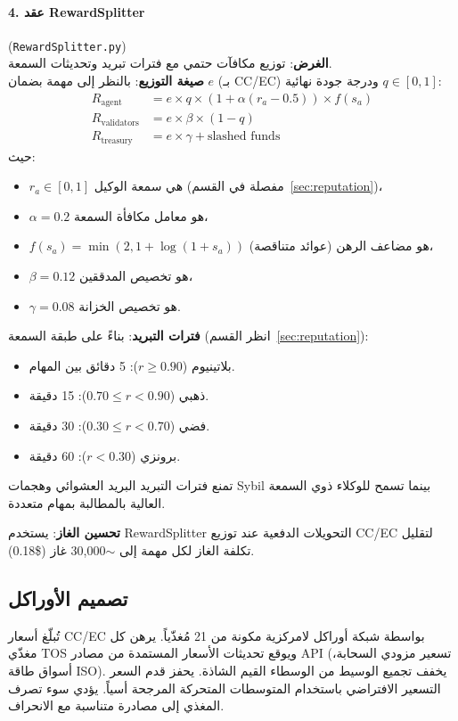 \documentclass[11pt]{article}
\begin{document}
\paragraph{4. عقد RewardSplitter} (\texttt{RewardSplitter.py})\\
\textbf{الغرض}: توزيع مكافآت حتمي مع فترات تبريد وتحديثات السمعة.\\
\textbf{صيغة التوزيع}: بالنظر إلى مهمة بضمان $e$ (بـ CC/EC) ودرجة جودة نهائية $q \in [0,1]$:
\begin{align}
R_{\text{agent}} &= e \times q \times \left(1 + \alpha (r_a - 0.5)\right) \times f(s_a) \label{eq:reward-agent} \\
R_{\text{validators}} &= e \times \beta \times (1-q) \label{eq:reward-validators} \\
R_{\text{treasury}} &= e \times \gamma + \text{slashed funds} \label{eq:reward-treasury}
\end{align}
حيث:
\begin{itemize}[noitemsep]
  \item $r_a \in [0,1]$ هي سمعة الوكيل (مفصلة في القسم~\ref{sec:reputation})،
  \item $\alpha = 0.2$ هو معامل مكافأة السمعة،
  \item $f(s_a) = \min(2, 1 + \log(1+s_a))$ هو مضاعف الرهن (عوائد متناقصة)،
  \item $\beta = 0.12$ هو تخصيص المدققين،
  \item $\gamma = 0.08$ هو تخصيص الخزانة.
\end{itemize}
\textbf{فترات التبريد}: بناءً على طبقة السمعة (انظر القسم~\ref{sec:reputation}):
\begin{itemize}[noitemsep]
  \item بلاتينيوم ($r \geq 0.90$): 5 دقائق بين المهام.
  \item ذهبي ($0.70 \leq r < 0.90$): 15 دقيقة.
  \item فضي ($0.30 \leq r < 0.70$): 30 دقيقة.
  \item برونزي ($r < 0.30$): 60 دقيقة.
\end{itemize}
تمنع فترات التبريد البريد العشوائي وهجمات Sybil بينما تسمح للوكلاء ذوي السمعة العالية بالمطالبة بمهام متعددة.

\textbf{تحسين الغاز}: يستخدم RewardSplitter التحويلات الدفعية عند توزيع CC/EC لتقليل تكلفة الغاز لكل مهمة إلى $\sim$30,000 غاز (\$0.18).

\subsection{تصميم الأوراكل}
تُبلّغ أسعار CC/EC بواسطة شبكة أوراكل لامركزية مكونة من 21 مُغذّياً. يرهن كل مغذّي TOS ويوقع تحديثات الأسعار المستمدة من مصادر API (تسعير مزودي السحابة، أسواق طاقة ISO). يخفف تجميع الوسيط من الوسطاء القيم الشاذة. يحفز قدم السعر التسعير الافتراضي باستخدام المتوسطات المتحركة المرجحة أسياً. يؤدي سوء تصرف المغذي إلى مصادرة متناسبة مع الانحراف.
\end{document}
